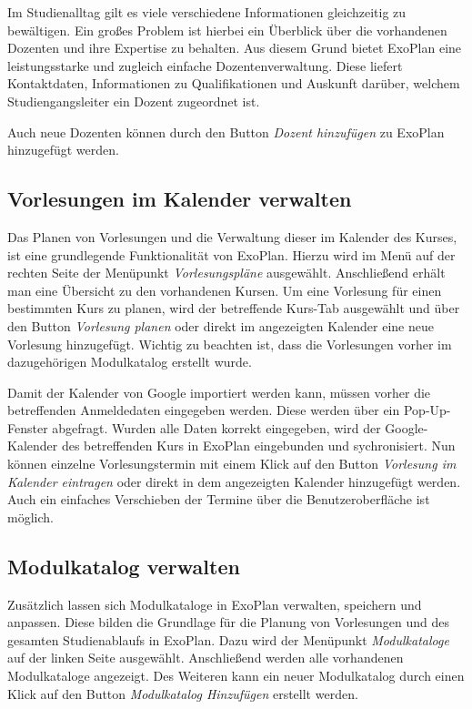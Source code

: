 Im Studienalltag gilt es viele verschiedene Informationen gleichzeitig zu bewältigen. 
Ein großes Problem ist hierbei ein Überblick über die vorhandenen Dozenten und ihre Expertise zu behalten. 
Aus diesem Grund bietet ExoPlan eine leistungsstarke und zugleich einfache Dozentenverwaltung. 
Diese liefert Kontaktdaten, Informationen zu Qualifikationen und Auskunft darüber, welchem Studiengangsleiter ein Dozent zugeordnet ist.

Auch neue Dozenten können durch den Button \textit{Dozent hinzufügen} zu ExoPlan hinzugefügt werden.
\subsection{Vorlesungen im Kalender verwalten}

Das Planen von Vorlesungen und die Verwaltung dieser im Kalender des Kurses, ist eine grundlegende Funktionalität von ExoPlan. 
Hierzu wird im Menü auf der rechten Seite der Menüpunkt \textit{Vorlesungspläne} ausgewählt. 
Anschließend erhält man eine Übersicht zu den vorhandenen Kursen. 
Um eine Vorlesung für einen bestimmten Kurs zu planen, wird der betreffende Kurs-Tab ausgewählt und über den Button \textit{Vorlesung planen} oder direkt im angezeigten Kalender eine neue Vorlesung hinzugefügt. 
Wichtig zu beachten ist, dass die Vorlesungen vorher im dazugehörigen Modulkatalog erstellt wurde.

Damit der Kalender von Google importiert werden kann, müssen vorher die betreffenden Anmeldedaten eingegeben werden. 
Diese werden über ein Pop-Up-Fenster abgefragt. 
Wurden alle Daten korrekt eingegeben, wird der Google-Kalender des betreffenden Kurs in ExoPlan eingebunden und sychronisiert. 
Nun können einzelne Vorlesungstermin mit einem Klick auf den Button \textit{Vorlesung im Kalender eintragen} oder direkt in dem angezeigten Kalender hinzugefügt werden. 
Auch ein einfaches Verschieben der Termine über die Benutzeroberfläche ist möglich.

\subsection{Modulkatalog verwalten}

Zusätzlich lassen sich Modulkataloge in ExoPlan verwalten, speichern und anpassen. 
Diese bilden die Grundlage für die Planung von Vorlesungen und des gesamten Studienablaufs in ExoPlan. 
Dazu wird der Menüpunkt \textit{Modulkataloge} auf der linken Seite ausgewählt. 
Anschließend werden alle vorhandenen Modulkataloge angezeigt. 
Des Weiteren kann ein neuer Modulkatalog durch einen Klick auf den Button \textit{Modulkatalog Hinzufügen} erstellt werden. 

